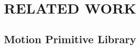 \section{RELATED WORK}
\begin{comment}
\subsection{Quadrotor Trajectory Planning}

The classical planners formulate trajectory planning as a nonlinear optimization problem and online optimizes a feasible trajectory, which trades off motion smoothness, dynamical feasibility, and collision violation. However, these planners requires large computational power to extract free space or environment representation methods, 

such as occupancy grid map\cite{zhou2020ego}, ESDF\cite{zhou2020robust}, SFC\cite{liu2017planning}. Observing this shortcoming, our community has also been exploring more lightweight environment representation methods. Mapless\cite{ji2021mapless} kd-tree . Meanwhile, the motion primitive planners\cite{ryll2019efficient,florence2020integrated} generate a bunch of trajectories in a sampling space, use the kd-tree to select safe trajectories, and then pick up a trajectory with the minimum user-defined cost to execute. Because the sampled trajectories are not optimized and the sampling resolution is limited, the quality of the generated trajectory cannot always be guaranteed.
In summary, the above methods cannot realize the wish that enjoys both efficiency and efficacy.
\end{comment}

\subsection{Motion Primitive Library}

